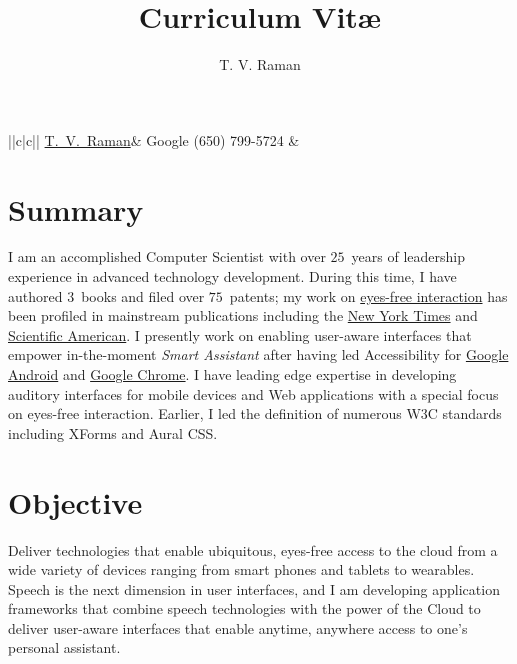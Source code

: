 \documentclass{article}
\title{Curriculum Vit\ae}
\author{T. V. Raman}
\begin{document}
\begin{center}
\begin{tabular}{||c|c||}\hline
{\href{https://en.wikipedia.org/wiki/T._V._Raman}{T.\  V.\  Raman}}&
  {Google}\newrow
  \newrow
\phone(650) 799-5724 &
\href{mailto:tv.raman.tv@gmail.com}{}  \newrow
\end{tabular}
\end{center}

\section*{Summary}

I am an accomplished Computer Scientist with over $25$~years of
leadership experience in {advanced technology development}. During
this time, I have authored $3$~books and filed over $75$~patents; my
work on \href{http://www.youtube.com/watch?v=QPTcNj-3kI8}{eyes-free
  interaction} has been profiled in mainstream publications including
the
\href{http://www.nytimes.com/2009/01/04/business/04blind.html?_r=1}{New
  York Times} and
\href{http://emacspeak.sourceforge.net/raman/sciam-0996profile.html}{Scientific
  American}. I presently work on enabling user-aware interfaces that
empower in-the-moment \emph{Smart Assistant} after having led
Accessibility for \href{http://eyes-free.blogspot.com}{Google Android}
and \href{http://chromevox.blogspot.com}{Google Chrome}. I have
leading edge expertise in developing auditory interfaces for mobile
devices and Web applications with a special focus on eyes-free
interaction. Earlier, I led the definition of numerous W3C standards
including XForms and Aural CSS.

\section*{Objective} 

Deliver technologies that enable ubiquitous, eyes-free access to
 the cloud  from a wide variety of devices ranging
from smart phones and tablets to wearables. Speech is the next
dimension in user interfaces, and I am developing application
frameworks that combine speech technologies with the power of the
 Cloud to deliver user-aware interfaces that enable anytime,
anywhere access to one's  personal  assistant.
\end{document}

